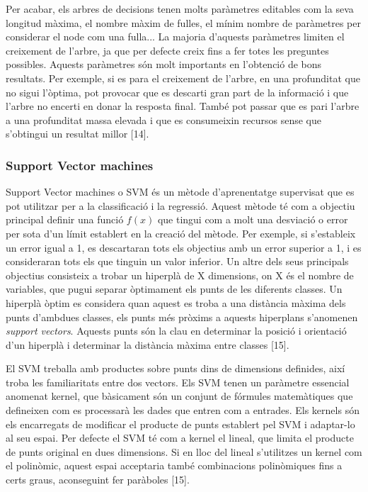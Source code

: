 \documentclass[10pt,a4paper,twocolumn,twoside]{article}
\begin{document}
Per acabar, els arbres de decisions tenen molts paràmetres editables com la seva longitud màxima, el nombre màxim de fulles, el mínim nombre de paràmetres per considerar el node com una fulla... La majoria d'aquests paràmetres limiten el creixement de l'arbre, ja que per defecte creix fins a fer totes les preguntes possibles. Aquests paràmetres són molt importants en l'obtenció de bons resultats. Per exemple, si es para el creixement de l'arbre, en una profunditat que no sigui l'òptima, pot provocar que es descarti gran part de la informació i que l'arbre no encerti en donar la resposta final. També pot passar que es pari l'arbre a una profunditat massa elevada i que es consumeixin recursos sense que s'obtingui un resultat millor [14].

\subsubsection{Support Vector machines}
Support Vector machines o SVM és un mètode d'aprenentatge supervisat que es pot utilitzar per a la classificació i la regressió. Aquest mètode té com a objectiu principal definir una funció $f(x)$ que tingui com a molt una desviació o error per sota d'un límit establert en la creació del mètode. Per exemple, si s'estableix un error igual a 1, es descartaran tots els objectius amb un error superior a 1, i es consideraran tots els que tinguin un valor inferior. Un altre dels seus principals objectius consisteix a trobar un hiperplà de X dimensions, on X és el nombre de variables, que pugui separar òptimament els punts de les diferents classes. Un hiperplà òptim es considera quan aquest es troba a una distància màxima dels punts d'ambdues classes, els punts més pròxims a aquests hiperplans s'anomenen \textit{support vectors}. Aquests punts són la clau en determinar la posició i orientació d'un hiperplà i determinar la distància màxima entre classes [15].

El SVM treballa amb productes sobre punts dins de dimensions definides, així troba les familiaritats entre dos vectors. Els SVM tenen un paràmetre essencial anomenat kernel, que bàsicament són un conjunt de fórmules matemàtiques que defineixen com es processarà les dades que entren com a entrades. Els kernels són els encarregats de modificar el producte de punts establert pel SVM i adaptar-lo al seu espai. Per defecte el SVM té com a kernel el lineal, que limita el producte de punts original en dues dimensions. Si en lloc del lineal s'utilitzes un kernel com el polinòmic, aquest espai acceptaria també combinacions polinòmiques fins a certs graus, aconseguint fer paràboles [15].
\end{document}
